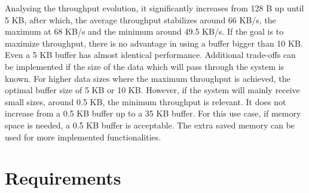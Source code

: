Analysing the throughput evolution, it significantly increases from 128 B up until 5 KB, after which, the average throughput stabilizes around 66 KB/s, the maximum at 68 KB/s and the minimum around 49.5 KB/s. If the goal is to maximize throughput, there is no advantage in using a buffer bigger than 10 KB. Even a 5 KB buffer has almost identical performance. Additional trade-offs can be implemented if the size of the data which will pass through the system is known. For higher data sizes where the maximum throughput is achieved, the optimal buffer size of 5 KB or 10 KB. However, if the system will mainly receive small sizes, around 0.5 KB, the minimum throughput is relevant. It does not increase from a 0.5 KB buffer up to a 35 KB buffer. For this use case, if memory space is needed, a 0.5 KB buffer is acceptable. The extra saved memory can be used for more implemented functionalities.




\section{Requirements}\label{chap:evaluation:requirements}

